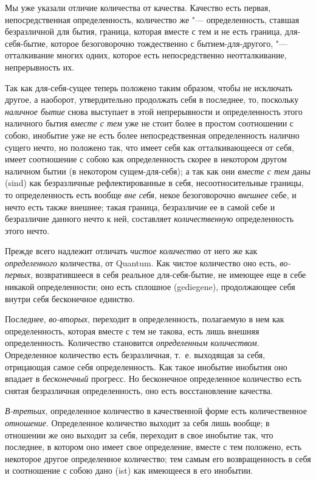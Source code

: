 Мы уже указали отличие количества от качества. Качество есть первая,
непосредственная определенность, количество же "--- определенность, ставшая
безразличной для бытия, граница, которая вместе с тем и не есть граница,
для-себя-бытие, которое безоговорочно тождественно с бытием-для-другого,
"--- отталкивание многих одних, которое есть непосредственно
неотталкивание, непрерывность их.

Так как для-себя-сущее теперь положено таким образом, чтобы не исключать
другое, а наоборот, утвердительно продолжать себя в последнее, то,
поскольку {\em наличное бытие} снова выступает в этой
непрерывности и определенность этого наличного бытия
{\em вместе с тем} уже не стоит более в простом
соотношении с собою, инобытие уже не есть более непосредственная
определенность налично сущего нечто, но положено так, что имеет себя как
отталкивающееся от себя, имеет соотношение с собою как определенность
скорее в некотором другом наличном бытии (в некотором сущем-для-себя); а
так как они {\em вместе с тем} даны
(sind) как безразличные рефлектированные в себя,
несоотносительные границы, то определенность есть вообще
{\em вне себя}, некое безоговорочно
{\em внешнее} себе, и нечто есть также внешнее; такая
граница, безразличие ее в самой себе и безразличие данного нечто к ней,
составляет {\em количественную} определенность этого нечто.

Прежде всего надлежит отличать {\em чистое количество}
от него же как {\em определенного} количества, от
Quantum. Как чистое количество оно есть,
{\em во-первых}, возвратившееся в себя реальное
для-себя-бытие, не имеющее еще в себе никакой определенности; оно есть
сплошное (gediegene), продолжающее себя внутри себя бесконечное единство.

Последнее, {\em во-вторых}, переходит в определенность,
полагаемую в нем как определенность, которая вместе с тем не такова,
есть лишь внешняя определенность. Количество становится
{\em определенным количеством}. Определенное количество
есть безразличная, т.~е. выходящая за себя, отрицающая самое себя
определенность. Как такое инобытие инобытия оно впадает в
{\em бесконечный} прогресс. Но бесконечное определенное количество есть
снятая безразличная определенность, оно есть восстановление качества.

{\em В-третьих}, определенное количество в качественной
форме есть количественное {\em отношение}. Определенное
количество выходит за себя лишь вообще; в отношении же оно выходит за себя,
переходит в свое инобытие так, что последнее, в котором оно имеет свое
определение, вместе с тем положено, есть некоторое другое определенное
количество; тем самым его возвращенность в себя и соотношение с собою дано
(ist) как имеющееся в его инобытии.

